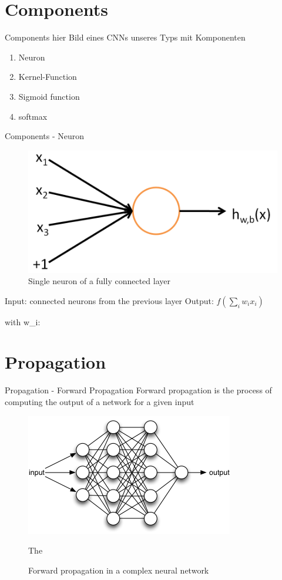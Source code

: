 \documentclass[12pt]{beamer}
\begin{document}
\section{Components}
\begin{frame}{Components}
hier Bild eines CNNs unseres Typs mit Komponenten


\begin{enumerate}
\item Neuron
\item Kernel-Function
\item Sigmoid function
\item softmax
\end{enumerate}

\end{frame}
\begin{frame}{Components - Neuron}

\begin{figure}
\centering
\includegraphics[width = 0.4\linewidth]{images/SingleNeuron.png}
\caption{Single neuron of a fully connected layer}
\label{fig:principle}
\end{figure}
Input: connected neurons from the previous layer \newline
Output: $f (\sum_{i}{w_i x_i})$

with \newline
w_i: 
\end{frame}



\section{Propagation}

\begin{frame}{Propagation - Forward Propagation}
Forward propagation is  the process of computing the output of a network for a given input
 \begin{figure}
\centering
\includegraphics[width = 0.4\linewidth]{images/forwardpropagation.png}
\caption{Forward propagation in a complex neural network}

The 
\label{fig:principle}
\end{figure}
\end{frame}
\end{document}

